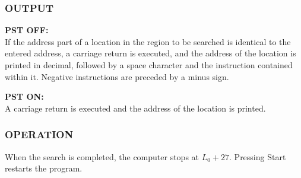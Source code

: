 \subsubsection*{OUTPUT}
\textbf{\textsf{PST OFF}:} \\
If the address part of a location in the region to be searched is identical to the entered address, a carriage return is executed, and the address of the location is printed in decimal, followed by a space character and the instruction contained within it. Negative instructions are preceded by a minus sign.

\noindent \textbf{\textsf{PST ON}:} \\
A carriage return is executed and the address of the location is printed.

\subsubsection*{OPERATION}
When the search is completed, the computer stops at $L_0 + 27$. Pressing \textsf{Start} restarts the program.
\newpage